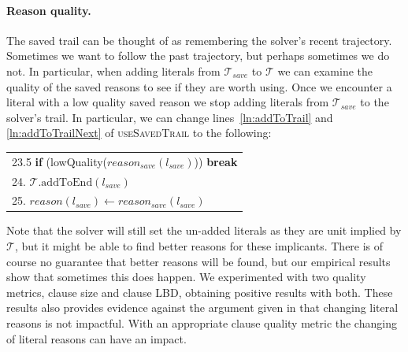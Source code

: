 \documentclass[runningheads]{llncs}
\newcommand{\trail}{\ensuremath{\mathcal{T}}}
\newcommand{\reason}[1]{\ensuremath{\mathit{reason}(#1)}}
\newcommand{\reasonsave}[1]{\ensuremath{\mathit{reason_{\mathit{save}}(#1)}}}
\newcommand{\litsave}{\ensuremath{\mathit{l_{\mathit{save}}}}}
\newcommand{\trailsave}{\trail_{\mathit{save}}}
\newcommand{\ust}{\textsc{useSavedTrail}\xspace}
\begin{document}
\paragraph{Reason quality.}
The saved trail can be thought of as remembering the solver's recent
trajectory. Sometimes we want to follow the past trajectory, but
perhaps sometimes we do not. In particular, when adding literals from
$\trailsave{}$ to $\trail$ we can examine the quality of the saved
reasons to see if they are worth using. Once we encounter a literal
with a low quality saved reason we stop adding literals from
$\trailsave$ to the solver's trail. In particular, we can change
lines~\ref{ln:addToTrail} and \ref{ln:addToTrailNext} of \ust
to the following:\\
\begin{tabular}[t]{l}
23.5 \qquad \textbf{if} (lowQuality($\reasonsave{\litsave}$)) \textbf{break}\\
24.  \qquad $\trail.\mathrm{addToEnd(\litsave)}$\\
25.  \qquad $\reason{\litsave}\gets \reasonsave{\litsave}$
\end{tabular}

Note that the solver will still set the un-added literals as they are
unit implied by $\trail$, but it might be able to find better reasons
for these implicants. There is of course no guarantee that better
reasons will be found, but our empirical results show that sometimes
this does happen. We experimented with two quality metrics, clause
size and clause LBD, obtaining positive results with both. These
results also provides evidence against the argument given in
\cite{DBLP:journals/jsat/TakRH11} that changing literal reasons is not
impactful. With an appropriate clause quality metric the changing of literal
reasons can have an impact.

\end{document}
